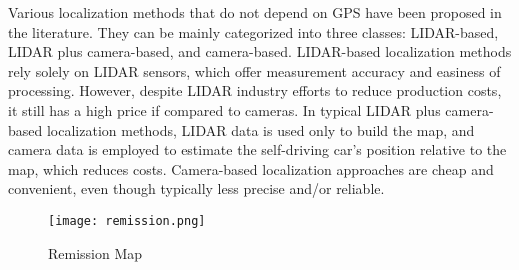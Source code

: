 Various localization methods that do not depend on GPS have been proposed in the
literature. They can be mainly categorized into three classes: LIDAR-based,
LIDAR plus camera-based, and camera-based. LIDAR-based localization methods rely
solely on LIDAR sensors, which offer measurement accuracy and easiness of
processing. However, despite LIDAR industry efforts to reduce production costs,
it still has a high price if compared to cameras. In typical LIDAR plus
camera-based localization methods, LIDAR data is used only to build the map, and
camera data is employed to estimate the self-driving car’s position relative to
the map, which reduces costs. Camera-based localization approaches are cheap and
convenient, even though typically less precise and/or reliable.

\begin{figure}[h]
    \centering
    \texttt{[image: remission.png]}
    \caption{Remission Map}
    \label{fig:lidar}
\end{figure}
